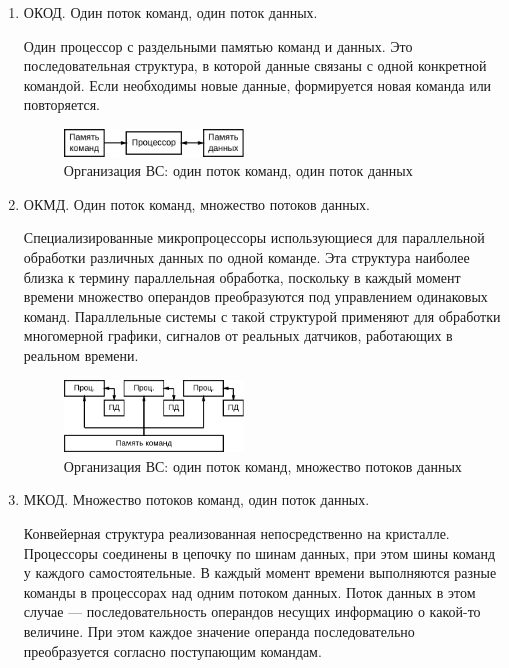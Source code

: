 \documentclass[unicode, 12pt, a4paper, oneside]{article}
\begin{document}
\begin{enumerate}
\item ОКОД. Один поток команд, один поток данных.

Один процессор с раздельными памятью команд и данных. Это последовательная структура, в которой данные связаны с одной конкретной командой. Если необходимы новые данные, формируется новая команда или повторяется.

\begin{figure}[H]
\centering
\includegraphics[width=0.45\textwidth]{152_okod.pdf}
\caption{Организация ВС: один поток команд, один поток данных}
\end{figure}

\item ОКМД. Один поток команд, множество потоков данных.
\par Специализированные микропроцессоры использующиеся для параллельной обработки различных данных по одной команде. Эта структура наиболее близка к термину параллельная обработка, поскольку в каждый момент времени множество операндов преобразуются под управлением одинаковых команд. Параллельные системы с такой структурой применяют для обработки многомерной графики, сигналов от реальных датчиков, работающих в реальном времени.

\begin{figure}[H]
\centering
\includegraphics[width=0.45\textwidth]{152_okmd.pdf}
\caption{Организация ВС: один поток команд, множество потоков данных}
\end{figure}

\item МКОД. Множество потоков команд, один поток данных.
\par Конвейерная структура реализованная непосредственно на кристалле. Процессоры соединены в цепочку по шинам данных, при этом шины команд у каждого самостоятельные. В каждый момент времени выполняются разные команды в процессорах над одним потоком данных. Поток данных в этом случае --- последовательность операндов несущих информацию о какой-то величине. При этом каждое значение операнда последовательно преобразуется согласно поступающим командам.


\end{enumerate}
\end{document}
